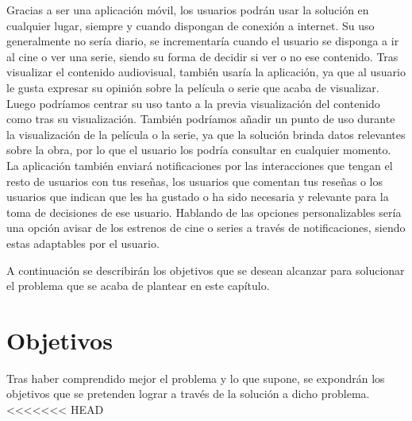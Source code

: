 Gracias a ser una aplicación móvil, los usuarios podrán usar la solución en cualquier lugar, siempre y 
cuando dispongan de conexión a internet. Su uso generalmente no sería diario, se incrementaría cuando 
el usuario se disponga a ir al cine o ver una serie, siendo su forma de decidir si ver o no ese 
contenido. Tras visualizar el contenido audiovisual, también usaría la aplicación, ya que al usuario le 
gusta expresar su opinión sobre la película o serie que acaba de visualizar. Luego podríamos centrar su 
uso tanto a la previa visualización del contenido como tras su visualización. También podríamos añadir 
un punto de uso durante la visualización de la película o la serie, ya que la solución brinda datos 
relevantes sobre la obra, por lo que el usuario los podría consultar en cualquier momento. La 
aplicación también enviará notificaciones por las interacciones que tengan el resto de usuarios con tus 
reseñas, los usuarios que comentan tus reseñas o los usuarios que indican que les ha gustado o ha sido 
necesaria y relevante para la toma de decisiones de ese usuario. Hablando de las opciones 
personalizables sería una opción avisar de los estrenos de cine o series a través de notificaciones, 
siendo estas adaptables por el usuario.

A continuación se describirán los objetivos que se desean alcanzar para solucionar el problema que se 
acaba de plantear en este capítulo.

\section{Objetivos}

Tras haber comprendido mejor el problema y lo que supone, se expondrán los objetivos que se pretenden 
lograr a través de la solución a dicho problema.
<<<<<<< HEAD


